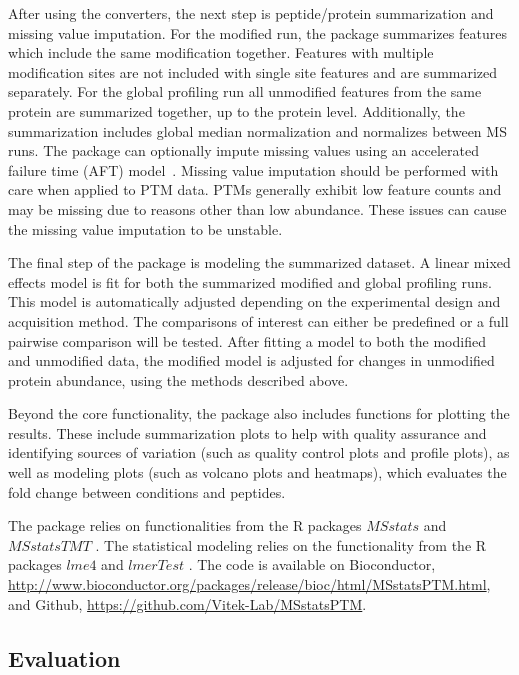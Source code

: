\documentclass[mcp]{article}
\numberwithin{table}{section}
\begin{document}
After using the converters, the next step is peptide/protein summarization and missing value imputation. For the modified run, the package summarizes features which include the same modification together. Features with multiple modification sites are not included with single site features and are summarized separately. For the global profiling run all unmodified features from the same protein are summarized together, up to the protein level. Additionally, the summarization includes global median normalization and normalizes between MS runs. The package can optionally impute missing values using an accelerated failure time (AFT) model~\cite{Wei:1992}. Missing value imputation should be performed with care when applied to PTM data. PTMs generally exhibit low feature counts and may be missing due to reasons other than low abundance. These issues can cause the missing value imputation to be unstable.

The final step of the package is modeling the summarized dataset. A linear mixed effects model is fit for both the summarized modified and global profiling runs. This model is automatically adjusted depending on the experimental design and acquisition method. The comparisons of interest can either be predefined or a full pairwise comparison will be tested. After fitting a model to both the modified and unmodified data, the modified model is adjusted for changes in unmodified protein abundance, using the methods described above.

Beyond the core functionality, the package also includes functions for plotting the results. These include summarization plots to help with quality assurance and identifying sources of variation (such as quality control plots and profile plots), as well as modeling plots (such as volcano plots and heatmaps), which evaluates the fold change between conditions and peptides. 

The package relies on functionalities from the R packages $MSstats$ \cite{Choi:2014} and $MSstatsTMT$ \cite{Huang:2020}. The statistical modeling relies on the functionality from the R packages $lme4$ \cite{Bates2015} and $lmerTest$ \cite{Kuznetsova2017}. The code is available on Bioconductor, \url{http://www.bioconductor.org/packages/release/bioc/html/MSstatsPTM.html}, and Github, \url{https://github.com/Vitek-Lab/MSstatsPTM}.

\subsection*{Evaluation}
\end{document}
